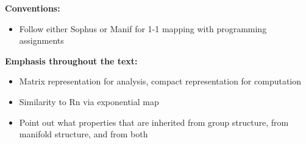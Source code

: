 \textbf{Conventions:}
\begin{itemize}
  \item Follow either Sophus or Manif for 1-1 mapping with programming assignments
\end{itemize}

\textbf{Emphasis throughout the text:}
\begin{itemize}
  \item Matrix representation for analysis, compact representation for computation
  \item Similarity to Rn via exponential map
  \item Point out what properties that are inherited from group structure, from manifold structure, and from both
\end{itemize}
